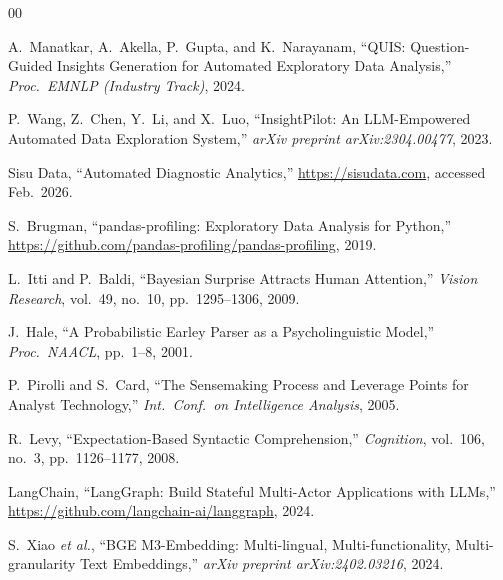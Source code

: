 \documentclass[conference]{IEEEtran}
\begin{document}
\begin{thebibliography}{00}

A.~Manatkar, A.~Akella, P.~Gupta, and K.~Narayanam,
``QUIS: Question-Guided Insights Generation for Automated Exploratory
Data Analysis,''
\textit{Proc.\ EMNLP (Industry Track)}, 2024.

P.~Wang, Z.~Chen, Y.~Li, and X.~Luo,
``InsightPilot: An LLM-Empowered Automated Data Exploration System,''
\textit{arXiv preprint arXiv:2304.00477}, 2023.

Sisu Data,
``Automated Diagnostic Analytics,''
\url{https://sisudata.com}, accessed Feb.\ 2026.

S.~Brugman,
``pandas-profiling: Exploratory Data Analysis for Python,''
\url{https://github.com/pandas-profiling/pandas-profiling}, 2019.

L.~Itti and P.~Baldi,
``Bayesian Surprise Attracts Human Attention,''
\textit{Vision Research}, vol.~49, no.~10, pp.\ 1295--1306, 2009.

J.~Hale,
``A Probabilistic Earley Parser as a Psycholinguistic Model,''
\textit{Proc.\ NAACL}, pp.\ 1--8, 2001.

P.~Pirolli and S.~Card,
``The Sensemaking Process and Leverage Points for Analyst Technology,''
\textit{Int.\ Conf.\ on Intelligence Analysis}, 2005.

R.~Levy,
``Expectation-Based Syntactic Comprehension,''
\textit{Cognition}, vol.~106, no.~3, pp.\ 1126--1177, 2008.


LangChain,
``LangGraph: Build Stateful Multi-Actor Applications with LLMs,''
\url{https://github.com/langchain-ai/langgraph}, 2024.


S.~Xiao \textit{et al.},
``BGE M3-Embedding: Multi-lingual, Multi-functionality,
Multi-granularity Text Embeddings,''
\textit{arXiv preprint arXiv:2402.03216}, 2024.


\end{thebibliography}
\end{document}
